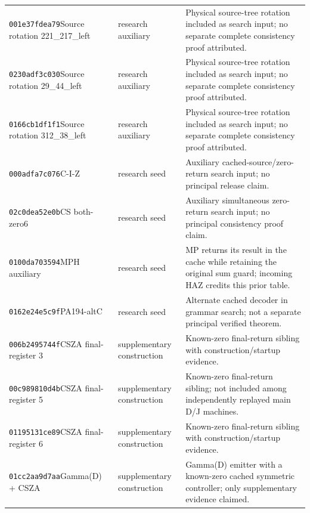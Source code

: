 {\begin{longtable}{@{}>{\raggedright\arraybackslash}p{}>{\raggedright\arraybackslash}p{}>{\raggedright\arraybackslash}p{}@{}}
\texttt{001e37fdea79}\newline Source rotation 221\_217\_left & research auxiliary & Physical source-tree rotation included as search input; no separate complete consistency proof attributed.\\
\texttt{0230adf3c030}\newline Source rotation 29\_44\_left & research auxiliary & Physical source-tree rotation included as search input; no separate complete consistency proof attributed.\\
\texttt{0166cb1df1f1}\newline Source rotation 312\_38\_left & research auxiliary & Physical source-tree rotation included as search input; no separate complete consistency proof attributed.\\
\texttt{000adfa7c076}\newline C-I-Z & research seed & Auxiliary cached-source/zero-return search input; no principal release claim.\\
\texttt{02c0dea52e0b}\newline CS both-zero6 & research seed & Auxiliary simultaneous zero-return search input; no principal consistency proof claim.\\
\texttt{0100da703594}\newline MPH auxiliary & research seed & MP returns its result in the cache while retaining the original sum guard; incoming HAZ credits this prior table.\\
\texttt{0162e24e5c9f}\newline PA194-altC & research seed & Alternate cached decoder in grammar search; not a separate principal verified theorem.\\
\texttt{006b2495744f}\newline CSZA final-register 3 & supplementary construction & Known-zero final-return sibling with construction/startup evidence.\\
\texttt{00c989810d4b}\newline CSZA final-register 5 & supplementary construction & Known-zero final-return sibling; not included among independently replayed main D/J machines.\\
\texttt{01195131ce89}\newline CSZA final-register 6 & supplementary construction & Known-zero final-return sibling with construction/startup evidence.\\
\texttt{01cc2aa9d7aa}\newline Gamma(D) + CSZA & supplementary construction & Gamma(D) emitter with a known-zero cached symmetric controller; only supplementary evidence claimed.\\

\end{longtable}}
